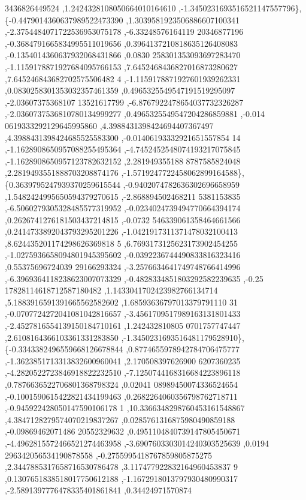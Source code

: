 \begin{DoxyCode}
      3436826449524 ,1.2424328108050664010164610 ,-1.3450231693516521147557796\},
\{-0.4479014360637989522473390 ,1.3039581923506886607100341 ,-2.3754484071722536953075178 ,-6.33248576164119
      20346877196 ,-0.3684791665834995511019656 ,0.3964137210818635126408083 ,-0.1354014360637932068431866 ,0.0830
      258301353093697283470 ,-1.1159178871927684095766153 ,7.6452468436827016873280627 ,7.645246843682702575506482
      4 ,-1.1159178871927601939262331 ,0.0830258301353032357461359 ,0.4965325549547191519295097 ,-2.03607375368107
      13521617799 ,-6.8767922478654037732326287 ,-2.0360737536810780134999277 ,0.4965325549547204286859881 ,-0.014
      0619333292129645995860 ,4.3988431398424694407367497 ,4.3988431398424685525583300 ,-0.01406193332921651557854
      14 ,-1.1628908650957088255495364 ,-4.7452452548074193217075845 ,-1.1628908650957123782632152 ,2.281949355188
      8787585824048 ,2.2819493551888703208874176 ,-1.5719247722458062899164588\},
\{0.3639795247939370259615544 ,-0.9402074782636302696658959 ,1.5482424995650594379270615 ,-2.868894502468211
      5381153835 ,-6.5060279305328485577319952 ,-0.0234024739494770664394174 ,0.2626741276181503437214815 ,-0.0732
      546339061358464661566 ,0.2414733892043793295201226 ,-1.0421917311371478032100413 ,8.624435201174298626369818
      5 ,6.7693173125623173902454255 ,-1.0275936658094801945395602 ,-0.0392236744490833816323416 ,0.55375696724039
      29166293324 ,-3.2576634641749748766414996 ,-6.3969364118238623007073329 ,-0.4828334851803292582239635 ,-0.25
      17828114618712587180482 ,1.1433041702423982766134714 ,5.1883916591391665562582602 ,1.68593636797013379791110
      31 ,-0.0707724272041081042816657 ,-3.4561709517989163131801433 ,-2.4527816554139150184710161 ,1.242432810805
      0701757747447 ,2.6108164366103361331283850 ,-1.3450231693516481179528910\},
\{-0.3343382496559668126678844 ,0.8774655978942784706475777 ,-1.3623851713313832600960041 ,2.170508397626900
      6207360235 ,-4.2820522723846918822232510 ,-7.1250744168316684223896118 ,0.7876636522706801368798324 ,0.02041
      08989450074336524654 ,-0.1001590615422821434199463 ,0.2682264060356798762718711 ,-0.945922428050147590106178
      1 ,10.3366348298760453161548867 ,4.3847128279574070219837267 ,0.0285761316875980490859188 ,-0.09869462071486
      20552329632 ,0.4951104840739147805450671 ,-4.4962815572466521274463958 ,-3.6907603303014240303525639 ,0.0194
      296342056534190878558 ,-0.2755995418767859805875275 ,2.3447885317658716530786478 ,3.117477922832164960453837
      9 ,0.1307651838518017750612188 ,-1.1672918013797930480990317 ,-2.5891397776478335401861841 ,0.34424971570874

\end{DoxyCode}

